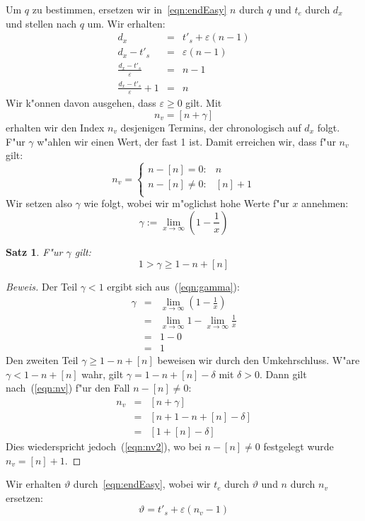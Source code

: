\documentclass[a4paper]{article}
\numberwithin{equation}{section}
\newtheorem{thm}{Satz}
\begin{document}
Um $q$ zu bestimmen, ersetzen wir in~\eqref{eqn:endEasy} $n$ durch $q$ und $t_e$
durch $d_x$ und stellen nach $q$ um. Wir erhalten:
\begin{eqnarray}
  d_x & = & t'_s + \varepsilon(n - 1) \\
  d_x - t'_s & = & \varepsilon(n - 1) \\
  \frac{d_x - t'_s}{\varepsilon} & = & n - 1 \\
  \frac{d_x - t'_s}{\varepsilon} + 1 & = & n
\end{eqnarray}
Wir k"onnen davon ausgehen, dass $\varepsilon \ge 0$ gilt. Mit
\begin{equation}\label{eqn:nv}n_v = \left[n + \gamma\right]\end{equation}
erhalten wir den Index $n_v$ desjenigen Termins, der chronologisch auf $d_x$
folgt. F"ur $\gamma$ w"ahlen wir einen Wert, der fast 1 ist. Damit erreichen
wir, dass f"ur $n_v$ gilt:
\begin{equation}\label{eqn:nv2}
  n_v = \left\{\begin{array}{ll}
  n - [n] = 0 : & n \\
  n - [n] \ne 0 : & [n] + 1 \\
  \end{array}\right.
\end{equation}
Wir setzen also $\gamma$ wie folgt, wobei wir m"oglichst hohe Werte f"ur $x$
annehmen:
\begin{equation}\label{eqn:gamma}
  \gamma := \lim_{x \to \infty} (1 - \frac{1}{x})
\end{equation}
\begin{thm}
F"ur $\gamma$ gilt:
\begin{equation}1 > \gamma \ge 1 - n + [n]\end{equation}
\end{thm}
\begin{proof}[Beweis]
Der Teil $\gamma < 1$ ergibt sich aus~(\ref{eqn:gamma}):
\begin{eqnarray}
  \gamma & = & \lim_{x \to \infty} (1 - \frac{1}{x}) \\
    & = & \lim_{x \to \infty} 1 - \lim_{x \to \infty} \frac{1}{x} \\
    & = & 1 - 0 \\
    & = & 1
\end{eqnarray}
Den zweiten Teil $\gamma \ge 1 - n + [n]$ beweisen wir durch den Umkehrschluss.
W"are $\gamma < 1 - n + [n]$ wahr, gilt $\gamma = 1 - n + [n] - \delta$ mit
$\delta > 0$. Dann gilt nach~(\ref{eqn:nv}) f"ur den Fall $n - [n] \ne 0$:
\begin{eqnarray}
  n_v & = & [ n + \gamma ] \\
    & = & [ n + 1 - n + [n] - \delta ] \\
    & = & [ 1 + [n] - \delta ]
\end{eqnarray}
Dies wiederspricht jedoch~(\ref{eqn:nv2}), wo bei $n - [n] \ne 0$ festgelegt
wurde $n_v = [n] + 1$.
\end{proof}
\noindent Wir erhalten $\vartheta$ durch~\eqref{eqn:endEasy}, wobei wir $t_e$
durch $\vartheta$ und $n$ durch $n_v$ ersetzen:
\begin{equation}\vartheta = t'_s + \varepsilon (n_v-1)\end{equation}
\end{document}
